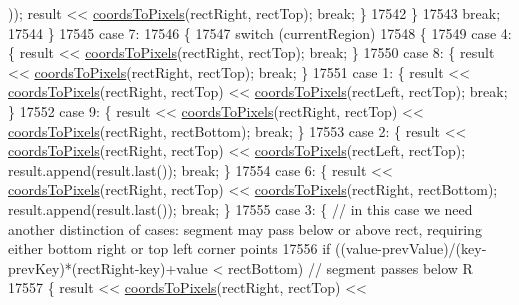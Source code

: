 \begin{DoxyCode}
      )); result << \hyperlink{class_q_c_p_abstract_plottable_ade710a776104b14c1c835168ce1bfc5c}{coordsToPixels}(rectRight, rectTop); \textcolor{keywordflow}{break}; \}
17542       \}
17543       \textcolor{keywordflow}{break};
17544     \}
17545     \textcolor{keywordflow}{case} 7:
17546     \{
17547       \textcolor{keywordflow}{switch} (currentRegion)
17548       \{
17549         \textcolor{keywordflow}{case} 4: \{ result << \hyperlink{class_q_c_p_abstract_plottable_ade710a776104b14c1c835168ce1bfc5c}{coordsToPixels}(rectRight, rectTop); \textcolor{keywordflow}{break}; \}
17550         \textcolor{keywordflow}{case} 8: \{ result << \hyperlink{class_q_c_p_abstract_plottable_ade710a776104b14c1c835168ce1bfc5c}{coordsToPixels}(rectRight, rectTop); \textcolor{keywordflow}{break}; \}
17551         \textcolor{keywordflow}{case} 1: \{ result << \hyperlink{class_q_c_p_abstract_plottable_ade710a776104b14c1c835168ce1bfc5c}{coordsToPixels}(rectRight, rectTop) << 
      \hyperlink{class_q_c_p_abstract_plottable_ade710a776104b14c1c835168ce1bfc5c}{coordsToPixels}(rectLeft, rectTop); \textcolor{keywordflow}{break}; \}
17552         \textcolor{keywordflow}{case} 9: \{ result << \hyperlink{class_q_c_p_abstract_plottable_ade710a776104b14c1c835168ce1bfc5c}{coordsToPixels}(rectRight, rectTop) << 
      \hyperlink{class_q_c_p_abstract_plottable_ade710a776104b14c1c835168ce1bfc5c}{coordsToPixels}(rectRight, rectBottom); \textcolor{keywordflow}{break}; \}
17553         \textcolor{keywordflow}{case} 2: \{ result << \hyperlink{class_q_c_p_abstract_plottable_ade710a776104b14c1c835168ce1bfc5c}{coordsToPixels}(rectRight, rectTop) << 
      \hyperlink{class_q_c_p_abstract_plottable_ade710a776104b14c1c835168ce1bfc5c}{coordsToPixels}(rectLeft, rectTop); result.append(result.last()); \textcolor{keywordflow}{break}; \}
17554         \textcolor{keywordflow}{case} 6: \{ result << \hyperlink{class_q_c_p_abstract_plottable_ade710a776104b14c1c835168ce1bfc5c}{coordsToPixels}(rectRight, rectTop) << 
      \hyperlink{class_q_c_p_abstract_plottable_ade710a776104b14c1c835168ce1bfc5c}{coordsToPixels}(rectRight, rectBottom); result.append(result.last()); \textcolor{keywordflow}{break}; \}
17555         \textcolor{keywordflow}{case} 3: \{ \textcolor{comment}{// in this case we need another distinction of cases: segment may pass below or above
       rect, requiring either bottom right or top left corner points}
17556           \textcolor{keywordflow}{if} ((value-prevValue)/(key-prevKey)*(rectRight-key)+value < rectBottom) \textcolor{comment}{// segment passes below R}
17557           \{ result << \hyperlink{class_q_c_p_abstract_plottable_ade710a776104b14c1c835168ce1bfc5c}{coordsToPixels}(rectRight, rectTop) << 

\end{DoxyCode}
